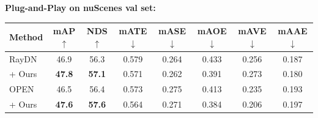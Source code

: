 \documentclass[portrait,a1paper,fontscale=0.42]{baposter}
\begin{document}
\begin{poster}
\begin{posterbox}[name=mono3dv, column=1, row=0]
\textbf{\color{blue}Plug-and-Play on nuScenes val set:}
\begin{center}
\small\setlength{\tabcolsep}{4pt}
\begin{tabular}{l|cc|ccccc}
  \hline
  Method & mAP$\uparrow$ & NDS$\uparrow$ & mATE$\downarrow$ & mASE$\downarrow$ & mAOE$\downarrow$ & mAVE$\downarrow$ & mAAE$\downarrow$ \\
  \hline
  RayDN & 46.9 & 56.3 & 0.579 & 0.264 & 0.433 & 0.256 & 0.187 \\
  \hspace{2pt}+ Ours & \textbf{47.8} & \textbf{57.1} & 0.571 & 0.262 & 0.391 & 0.273 & 0.180 \\
  \hline
  OPEN & 46.5 & 56.4 & 0.573 & 0.275 & 0.413 & 0.235 & 0.193 \\
  \hspace{2pt}+ Ours & \textbf{47.6} & \textbf{57.6} & 0.564 & 0.271 & 0.384 & 0.206 & 0.197 \\
  \hline
\end{tabular}
\end{center}

\end{posterbox}

\end{poster}
\end{document}
